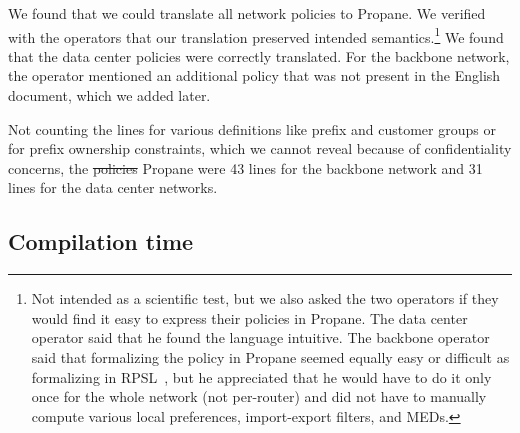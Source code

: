 \documentclass[10pt]{sigalternate052015} %
\newcommand{\sysname}{{\small \sf Propane}\xspace}
\providecommand{\DIFadd}[1]{{\protect\color{blue}\uwave{#1}}} %
\providecommand{\DIFdel}[1]{{\protect\color{red}\sout{#1}}}                      %
\providecommand{\DIFaddbegin}{} %
\providecommand{\DIFaddend}{} %
\providecommand{\DIFdelbegin}{} %
\providecommand{\DIFdelend}{} %
\begin{document}
We found that we could translate all network policies to \sysname. We verified with the operators that our translation preserved intended semantics.\footnote{Not intended as a scientific test, but we also asked the two operators if they would find it easy to express their policies in \sysname. The data center operator said that he found the language intuitive. The backbone operator said that formalizing the policy in \sysname seemed equally easy or difficult as formalizing in RPSL~\cite{RFC2622}, but he appreciated that he would have to do it only once for the whole network (not per-router) and did not have to manually compute various local preferences, import-export filters, and MEDs.} We found that the data center policies were correctly translated. For the backbone network, the operator mentioned an additional policy that was not present in the English document, which we added later.

Not counting the lines for various definitions like prefix and customer groups or for prefix ownership constraints, which we cannot reveal because of confidentiality concerns, the \DIFdelbegin %
\DIFdel{policies }\DIFdelend \DIFaddbegin \DIFadd{routing policies for }\sysname \DIFaddend were 43 lines for the backbone network and 31 lines for the data center networks.


\subsection{Compilation time}



\end{document}
